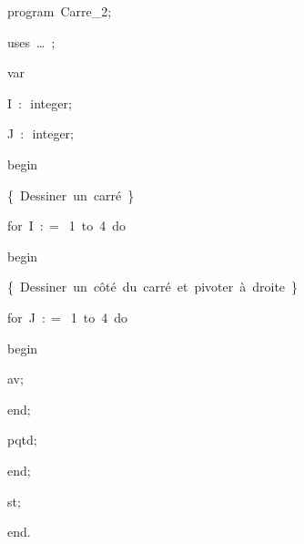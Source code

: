 
{
\parindent {}
\medskip

\carrenoir
\vspace{\neglskip}\mbox{\blc  \idt  \mcl program\idt \ Carre\_2$;$
}\par 
\vspace{\neglskip}\mbox{\blc \blk\idt \mcl uses\idt \ \ldots\ $;$
}\par 
\vspace{\neglskip}\mbox{\blc  \blk\idt  \mcl var\idt }\par 
\vspace{\neglskip}\mbox{\blc  \blk\blk\idt  I\ $:$\ integer$;$}\par 
\vspace{\neglskip}\mbox{\blc  \blk\blk\idt  J\ $:$\ integer$;$}\par 
\vspace{\neglskip}\mbox{\blc  \idt  \mcl begin\idt }\par 
\vspace{\neglskip}\mbox{\blc  \blk\idt  \cmt  \{\ Dessiner\ un\ carré\ \}\idt }\par 
\vspace{\neglskip}\mbox{\blc  \blk\idt  \mcl for\idt \ I\ $:$$=$\ 1\ \mcl to\idt \ 4\ \mcl do\idt }\par 
\vspace{\neglskip}\mbox{\blc  \blk\blk\idt  \mcl begin\idt }\par 
\vspace{\neglskip}\mbox{\blc  \blk\blk\blk\idt  \cmt  \{\ Dessiner\ un\ côté\ du\ carré\ et\ pivoter\ à\ droite\ \}\idt }\par 
\vspace{\neglskip}\mbox{\blc  \blk\blk\blk\idt  \mcl for\idt \ J\ $:$$=$\ 1\ \mcl to\idt \ 4\ \mcl do\idt }\par 
\vspace{\neglskip}\mbox{\blc  \blk\blk\blk\blk\idt  \mcl begin\idt }\par 
\vspace{\neglskip}\mbox{\blc  \blk\blk\blk\blk\blk\idt  av$;$\ }\par 
\vspace{\neglskip}\mbox{\blc  \blk\blk\blk\blk\idt  \mcl end\idt $;$}\par 
\vspace{\neglskip}\mbox{\blc  \blk\blk\blk\idt  pqtd$;$\ }\par 
\vspace{\neglskip}\mbox{\blc  \blk\blk\idt  \mcl end\idt $;$}\par 
\vspace{\neglskip}\mbox{\blc  \blk\idt  st$;$\ }\par 
\vspace{\neglskip}\mbox{\blc  \idt  \mcl end\idt $.$}\par 

\medskip }

